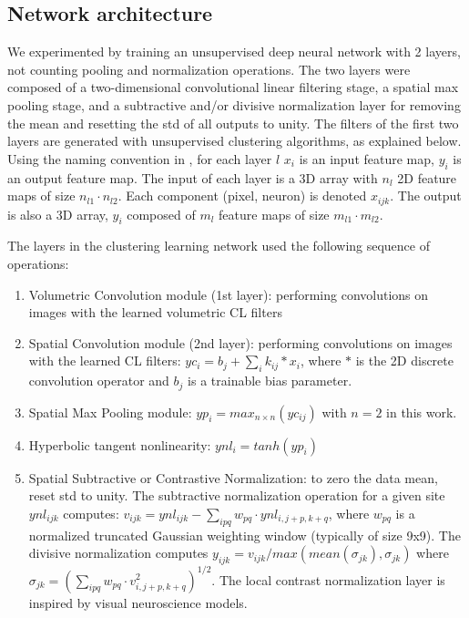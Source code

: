 \documentclass{article} %
\begin{document}
\subsection{Network architecture}
\label{sec-net-arch}

We experimented by training an unsupervised deep neural network with 2 layers, not counting pooling and normalization operations. The two layers were composed of a two-dimensional convolutional linear filtering stage, a spatial max pooling stage, and a subtractive and/or divisive normalization layer for removing the mean and resetting the std of all outputs to unity. 
The filters of the first two layers are generated with unsupervised clustering algorithms, as explained below. 
Using the naming convention in \cite{lecun_convolutional_2010}, for each layer $l$  $x_i$ is an input feature map, $y_i$ is an output feature map. The input of each layer is a 3D array with $n_l$ 2D feature maps of size $n_{l1} \cdot n_{l2}$. Each component (pixel, neuron) is denoted $x_{ijk}$. The output is also a 3D array, $y_i$ composed of $m_l$ feature maps of size $m_{l1} \cdot m_{l2}$.

The layers in the clustering learning network used the following sequence of operations:
\begin{enumerate}
\item Volumetric Convolution module (1st layer): performing convolutions on images with the learned volumetric CL filters
\item Spatial Convolution module (2nd layer): performing convolutions on images with the learned CL filters: $yc_i=b_j+\sum_i{k_{ij}\ast x_i}$, where $\ast$ is the 2D discrete convolution operator and $b_j$ is a trainable bias parameter.
\item Spatial Max Pooling module: $yp_i = max_{n \times n}(yc_{ij})$ with $n =  2$ in this work.
\item Hyperbolic tangent nonlinearity: $ynl_i = tanh(yp_i )$
\item Spatial Subtractive or Contrastive Normalization: to zero the data mean, reset std to unity. The subtractive normalization operation for a given site $ynl_{ijk}$ computes: $v_{ijk} = ynl_{ijk} - \sum_{ipq} w_{pq} \cdot ynl_{i,j+p,k+q}$, where $w_{pq}$ is a normalized truncated Gaussian weighting window (typically of size 9x9). The divisive normalization computes $y_{ijk} = v_{ijk}/max(mean(\sigma_{jk}),\sigma_{jk})$ where $\sigma_{jk} = (\sum_{ipq} w_{pq} \cdot v^2_{i,j+p,k+q})^{1/2}$. The local contrast normalization layer is inspired by visual neuroscience models.
\end{enumerate}
\end{document}
